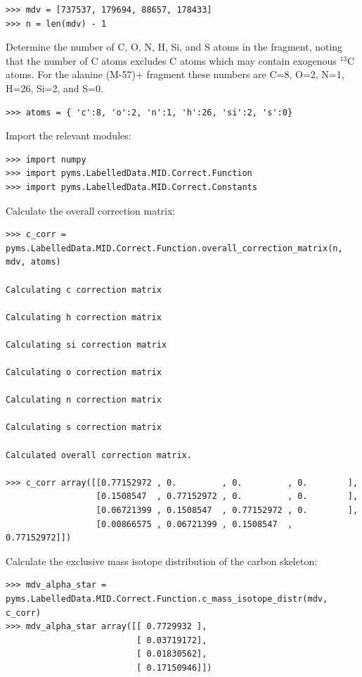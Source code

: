 \begin{verbatim}
>>> mdv = [737537, 179694, 88657, 178433]
>>> n = len(mdv) - 1
\end{verbatim}

Determine the number of C, O, N, H, Si, and S atoms in the fragment,
noting that the number of C atoms excludes C atoms which may contain
exogenous $^{13}$C atoms. For the alanine (M-57)+ fragment these
numbers are C=8, O=2, N=1, H=26, Si=2, and S=0.

\begin{verbatim} 
>>> atoms = { 'c':8, 'o':2, 'n':1, 'h':26, 'si':2, 's':0}
\end{verbatim}

Import the relevant modules:

\begin{verbatim}
>>> import numpy
>>> import pyms.LabelledData.MID.Correct.Function
>>> import pyms.LabelledData.MID.Correct.Constants
\end{verbatim}

Calculate the overall correction matrix:

\begin{verbatim}
>>> c_corr = 
pyms.LabelledData.MID.Correct.Function.overall_correction_matrix(n, mdv, atoms)

Calculating c correction matrix

Calculating h correction matrix

Calculating si correction matrix

Calculating o correction matrix

Calculating n correction matrix

Calculating s correction matrix

Calculated overall correction matrix.

>>> c_corr array([[0.77152972 , 0.         , 0.         , 0.        ],
                  [0.1508547  , 0.77152972 , 0.         , 0.        ],
                  [0.06721399 , 0.1508547  , 0.77152972 , 0.        ],
                  [0.00866575 , 0.06721399 , 0.1508547  , 0.77152972]])
\end{verbatim}

Calculate the exclusive mass isotope distribution of the carbon skeleton:

\begin{verbatim}
>>> mdv_alpha_star = 
pyms.LabelledData.MID.Correct.Function.c_mass_isotope_distr(mdv, c_corr)
>>> mdv_alpha_star array([[ 0.7729932 ],
                          [ 0.03719172],
                          [ 0.01830562],
                          [ 0.17150946]])
\end{verbatim}

